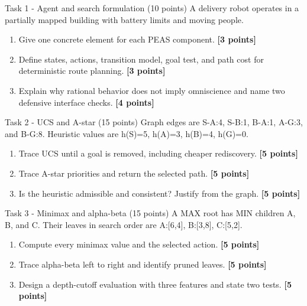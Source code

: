 \documentclass[aspectratio=169,11pt]{beamer}
\begin{document}
\begin{frame}{Task 1 - Agent and search formulation (10 points)}
\small
A delivery robot operates in a partially mapped building with battery limits and moving people.

\vspace{0.2cm}
\begin{enumerate}
\item[\textbf{a.}] Give one concrete element for each PEAS component. \hfill{\color{courseblue}\textbf{[3 points]}}
\item[\textbf{b.}] Define states, actions, transition model, goal test, and path cost for deterministic route planning. \hfill{\color{courseblue}\textbf{[3 points]}}
\item[\textbf{c.}] Explain why rational behavior does not imply omniscience and name two defensive interface checks. \hfill{\color{courseblue}\textbf{[4 points]}}
\end{enumerate}
\end{frame}

\begin{frame}{Task 2 - UCS and A-star (15 points)}
\small
Graph edges are S-A:4, S-B:1, B-A:1, A-G:3, and B-G:8. Heuristic values are h(S)=5, h(A)=3, h(B)=4, h(G)=0.

\vspace{0.2cm}
\begin{enumerate}
\item[\textbf{a.}] Trace UCS until a goal is removed, including cheaper rediscovery. \hfill{\color{courseblue}\textbf{[5 points]}}
\item[\textbf{b.}] Trace A-star priorities and return the selected path. \hfill{\color{courseblue}\textbf{[5 points]}}
\item[\textbf{c.}] Is the heuristic admissible and consistent? Justify from the graph. \hfill{\color{courseblue}\textbf{[5 points]}}
\end{enumerate}
\end{frame}

\begin{frame}{Task 3 - Minimax and alpha-beta (15 points)}
\small
A MAX root has MIN children A, B, and C. Their leaves in search order are A:[6,4], B:[3,8], C:[5,2].

\vspace{0.2cm}
\begin{enumerate}
\item[\textbf{a.}] Compute every minimax value and the selected action. \hfill{\color{courseblue}\textbf{[5 points]}}
\item[\textbf{b.}] Trace alpha-beta left to right and identify pruned leaves. \hfill{\color{courseblue}\textbf{[5 points]}}
\item[\textbf{c.}] Design a depth-cutoff evaluation with three features and state two tests. \hfill{\color{courseblue}\textbf{[5 points]}}
\end{enumerate}
\end{frame}
\end{document}
